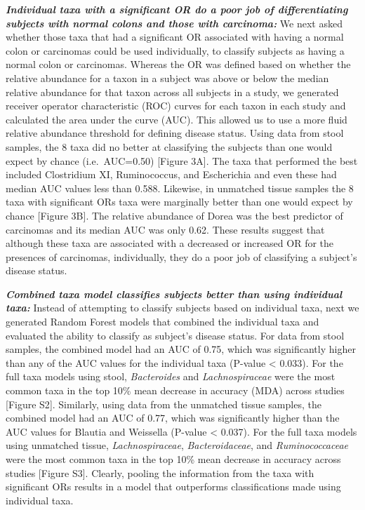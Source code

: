 \documentclass[12pt,]{article}
\begin{document}
\textbf{\emph{Individual taxa with a significant OR do a poor job of
differentiating subjects with normal colons and those with carcinoma:}}
We next asked whether those taxa that had a significant OR associated
with having a normal colon or carcinomas could be used individually, to
classify subjects as having a normal colon or carcinomas. Whereas the OR
was defined based on whether the relative abundance for a taxon in a
subject was above or below the median relative abundance for that taxon
across all subjects in a study, we generated receiver operator
characteristic (ROC) curves for each taxon in each study and calculated
the area under the curve (AUC). This allowed us to use a more fluid
relative abundance threshold for defining disease status. Using data
from stool samples, the 8 taxa did no better at classifying the subjects
than one would expect by chance (i.e.~AUC=0.50) {[}Figure 3A{]}. The
taxa that performed the best included Clostridium XI, Ruminococcus, and
Escherichia and even these had median AUC values less than 0.588.
Likewise, in unmatched tissue samples the 8 taxa with significant ORs
taxa were marginally better than one would expect by chance {[}Figure
3B{]}. The relative abundance of Dorea was the best predictor of
carcinomas and its median AUC was only 0.62. These results suggest that
although these taxa are associated with a decreased or increased OR for
the presences of carcinomas, individually, they do a poor job of
classifying a subject's disease status.

\textbf{\emph{Combined taxa model classifies subjects better than using
individual taxa:}} Instead of attempting to classify subjects based on
individual taxa, next we generated Random Forest models that combined
the individual taxa and evaluated the ability to classify as subject's
disease status. For data from stool samples, the combined model had an
AUC of 0.75, which was significantly higher than any of the AUC values
for the individual taxa (P-value \textless{} 0.033). For the full taxa
models using stool, \emph{Bacteroides} and \emph{Lachnospiraceae} were
the most common taxa in the top 10\% mean decrease in accuracy (MDA)
across studies {[}Figure S2{]}. Similarly, using data from the unmatched
tissue samples, the combined model had an AUC of 0.77, which was
significantly higher than the AUC values for Blautia and Weissella
(P-value \textless{} 0.037). For the full taxa models using unmatched
tissue, \emph{Lachnospiraceae}, \emph{Bacteroidaceae}, and
\emph{Ruminococcaceae} were the most common taxa in the top 10\% mean
decrease in accuracy across studies {[}Figure S3{]}. Clearly, pooling
the information from the taxa with significant ORs results in a model
that outperforms classifications made using individual taxa.
\end{document}
